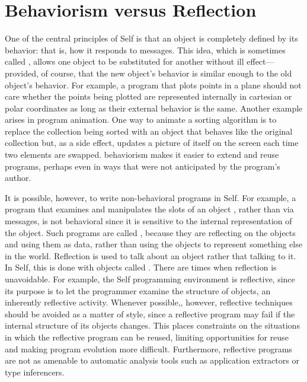 \documentclass[letterpaper,10pt,english]{sphinxmanual}
\begin{document}
\section{Behaviorism versus Reflection}
\label{\detokenize{progguid:behaviorism-versus-reflection}}
One of the central principles of Self is that an object is completely defined by its behavior: that
is, how it responds to messages. This idea, which is sometimes called , allows one object
to be substituted for another without ill effect—provided, of course, that the new object’s behavior
is similar enough to the old object’s behavior. For example, a program that plots points in a
plane should not care whether the points being plotted are represented internally in cartesian or polar
coordinates as long as their external behavior is the same. Another example arises in program
animation. One way to animate a sorting algorithm is to replace the collection being sorted with an
object that behaves like the original collection but, as a side effect, updates a picture of itself on the
screen each time two elements are swapped. behaviorism makes it easier to extend and reuse programs,
perhaps even in ways that were not anticipated by the program’s author.

It is possible, however, to write non-behavioral programs in Self. For example, a program that examines
and manipulates the slots of an object , rather than via messages, is not behavioral
since it is sensitive to the internal representation of the object. Such programs are called ,
because they are reflecting on the objects and using them as data, rather than using the objects to
represent something else in the world. Reflection is used to talk about an object rather that talking
to it. In Self, this is done with objects called . There are times when reflection is unavoidable.
For example, the Self programming environment is reflective, since its purpose is to let the
programmer examine the structure of objects, an inherently reflective activity. Whenever possible,,
however, reflective techniques should be avoided as a matter of style, since a reflective program
may fail if the internal structure of its objects changes. This places constraints on the situations in
which the reflective program can be reused, limiting opportunities for reuse and making program
evolution more difficult. Furthermore, reflective programs are not as amenable to automatic analysis
tools such as application extractors or type inferencers.
\end{document}
